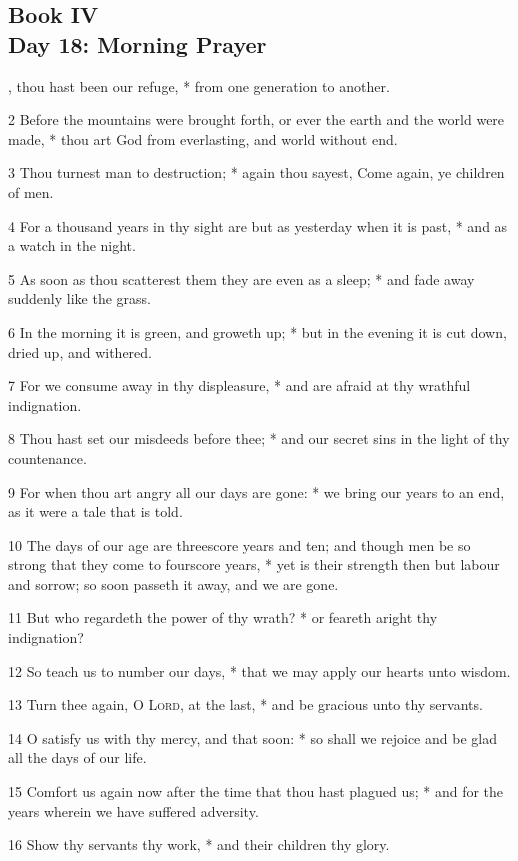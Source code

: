\subsection{Book IV\\Day 18: Morning Prayer}
, thou hast been our refuge, * from one generation to another.\par
2 Before the mountains were brought forth, or ever the earth and the world were made, * thou art God from everlasting, and world without end.\par
3 Thou turnest man to destruction; * again thou sayest, Come again, ye children of men.\par
4 For a thousand years in thy sight are but as yesterday when it is past, * and as a watch in the night.\par
5 As soon as thou scatterest them they are even as a sleep; * and fade away suddenly like the grass.\par
6 In the morning it is green, and groweth up; * but in the evening it is cut down, dried up, and withered.\par
7 For we consume away in thy displeasure, * and are afraid at thy wrathful indignation.\par
8 Thou hast set our misdeeds before thee; * and our secret sins in the light of thy countenance.\par
9 For when thou art angry all our days are gone: * we bring our years to an end, as it were a tale that is told.\par
10 The days of our age are threescore years and ten; and though men be so strong that they come to fourscore years, * yet is their strength then but labour and sorrow; so soon passeth it away, and we are gone.\par
11 But who regardeth the power of thy wrath? * or feareth aright thy indignation?\par
12 So teach us to number our days, * that we may apply our hearts unto wisdom.\par
13 Turn thee again, O {\textsc{Lord}}, at the last, * and be gracious unto thy servants.\par
14 O satisfy us with thy mercy, and that soon: * so shall we rejoice and be glad all the days of our life.\par
15 Comfort us again now after the time that thou hast plagued us; * and for the years wherein we have suffered adversity.\par
16 Show thy servants thy work, * and their children thy glory.\par
